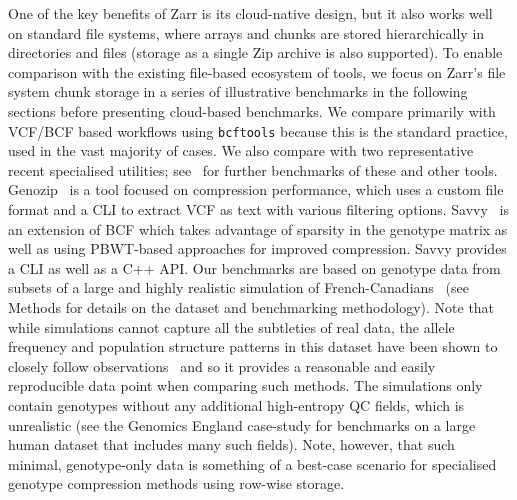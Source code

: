 \documentclass[a4paper,num-refs]{oup-contemporary}
\begin{document}
One of the key benefits of Zarr is its cloud-native design, 
but it also works well on standard file systems, where 
arrays and chunks are stored hierarchically in directories
and files (storage as a single Zip archive is also supported).
To enable comparison with the existing file-based ecosystem
of tools, we focus on Zarr's file system chunk storage in a series of illustrative 
benchmarks in the following sections before presenting cloud-based benchmarks. 
We compare primarily with
VCF/BCF based workflows using \texttt{bcftools} because this
is the standard practice, used in the vast majority of cases.
We also compare with two representative recent specialised utilities;
see~\cite{danek2018gtc,zhang2023gbc} for further benchmarks of 
these and other tools.
Genozip~\cite{lan2020genozip,lan2021genozip} is a tool focused 
on compression performance, which uses a custom file format 
and a CLI to extract VCF as text with various filtering options.
Savvy~\cite{lefaive2021sparse} is an extension of BCF which 
takes advantage of sparsity in the genotype matrix as well
as using PBWT-based approaches for improved compression.
Savvy provides a CLI as well as a C++ API.
Our benchmarks are based on genotype data 
from subsets of a large and highly realistic 
simulation of French-Canadians~\cite{anderson2023on}
(see Methods for details on the dataset and benchmarking methodology).
Note that while simulations cannot capture 
all the subtleties of real data, the allele frequency
and population structure patterns in this dataset 
have been shown to closely follow 
observations~\cite{anderson2023on} and so it provides 
a reasonable and easily reproducible data point 
when comparing such methods.
The simulations only contain genotypes without any additional
high-entropy QC fields, which is unrealistic 
(see the Genomics England case-study
for benchmarks on a large human dataset that includes 
many such fields). 
Note, however, that such minimal, genotype-only data 
is something of a best-case scenario for specialised genotype
compression methods using row-wise storage.
\end{document}
